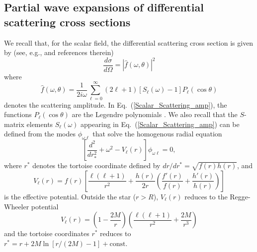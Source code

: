 \documentclass[aps,prd,longbibliography,reprint,twocolumn,amsmath,amssymb,amsfonts,showpacs,superscriptaddress]{revtex4-1}%
\begin{document}
\subsection{Partial wave expansions of differential scattering cross sections}
\label{SecIIb}

We recall that, for the scalar field, the differential scattering cross section is given by (see, e.g.,\cite{Dolan:2017rtj} and references therein)
\begin{equation}\label{Scalar_Scattering_diff}
  \frac{d\sigma}{d\Omega} = |\hat{f}(\omega,\theta)|^2
\end{equation}
where
\begin{equation}\label{Scalar_Scattering_amp}
 \hat{f}(\omega,\theta) = \frac{1}{2 i \omega} \sum_{\ell = 0}^{\infty} (2\ell+1)[S_{\ell}(\omega)-1]P_{\ell}(\cos\theta)
\end{equation}
denotes the scattering amplitude.  In Eq.~(\ref{Scalar_Scattering_amp}), the functions $P_{\ell}(\cos\theta)$ are the Legendre polynomials \cite{AS65}.  We also recall that the $S$-matrix elements $S_{\ell}(\omega)$ appearing in Eq.~(\ref{Scalar_Scattering_amp}) can be defined from the modes $\phi_{\omega \ell}$ that solve the homogenous radial equation
\begin{equation}
\label{H_Radial_equation}
\left[\frac{d^{2}}{dr_{\ast}^{2}}+\omega^{2}-V_{\ell}(r)\right]\phi_{\omega\ell}= 0,
\end{equation}
where $r^\ast$ denotes the tortoise coordinate defined by  $dr/dr^\ast =\sqrt{f(r)h(r)}$, and
\begin{equation}\label{Inside_Potentiel}
  V_{\ell}(r) =f(r)\left[\frac{\ell(\ell+1)}{r^2}+\frac{h(r)}{2r}\left(\frac{f'(r)}{f(r)}+\frac{h'(r)}{h(r)}\right)\right]
\end{equation}
is the effective potential. Outside the star ($r>R$), $V_{\ell}(r)$ reduces to the Regge-Wheeler potential
\begin{equation}\label{RW_Potentiel}
  V_{\ell}(r) =\left(1-\frac{2M}{r}\right)\left(\frac{\ell(\ell+1)}{r^2}+\frac{2M}{r^3}\right)
\end{equation}
and the tortoise coordinates $r^\ast$ reduces to $r^\ast = r+ 2M \ln [r/(2M) -1]+\mathrm{const}$.
\end{document}
